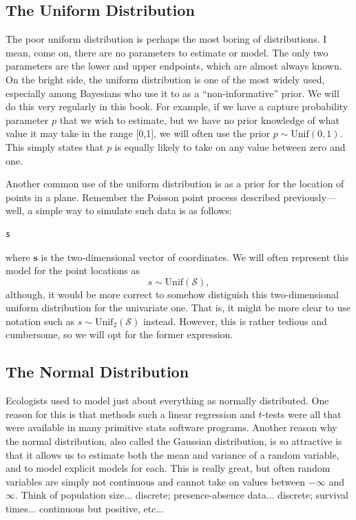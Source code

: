 \subsection{The Uniform Distribution}

The poor uniform distribution is perhaps the most boring of
distributions. I mean, come on, there are no parameters to estimate or
model. The only two parameters are the lower and upper endpoints,
which are almost always known. On the bright side, the uniform
distribution is one of the most widely used,
especially among Bayesians who use it to as a ``non-informative''
prior. We will do this very regularly in this book. For example, if we
have a capture probability parameter $p$ that we wish to estimate, but
we have no prior knowledge of what value it may take in the range
[0,1], we will often use the prior $p \sim \text{Unif}(0,1)$. This
simply states that $p$ is equally likely to take on any value between
zero and one.

Another common use of the uniform distribution is as a prior for the
location of points in a plane. Remember the Poisson point process
described previously---well, a simple way to simulate such data is as
follows:
\begin{verbatim}
s
\end{verbatim}
where $\mathbf{s}$ is the two-dimensional vector of
coordinates. We will often represent this model for the point
locations as
\begin{equation}
  s \sim \text{Unif}(\mathcal{S}),
\end{equation}
although, it would be more correct to somehow distiguish this
two-dimensional uniform distribution for the univariate one. That is,
it might be more clear to use notation such as
$s \sim \text{Unif}_2(\mathcal{S})$ instead. However, this is rather
tedious and cumbersome, so we will opt for the former expression.

\subsection{The Normal Distribution}

Ecologists used to model just about everything as normally
distributed. One reason for this is that methods such a linear
regression and $t$-tests were all that were available in many
primitive stats software programs. Another reason why the normal
distribution, also called the Gaussian distribution, is so attractive
is that it allows us to estimate both the mean and variance of a
random variable, and to model explicit models for each. This is really
great, but often random variables are simply not continuous and cannot
take on values between $-\infty$ and $\infty$. Think of
population size... discrete; presence-absence data... discrete;
survival times... continuous but positive, etc...


